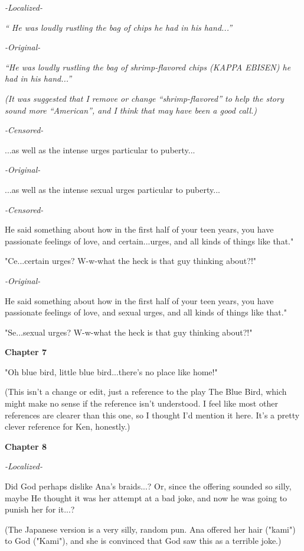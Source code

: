 \documentclass[
]{article}
\begin{document}
\emph{-Localized-}

\emph{`` He was loudly rustling the bag of chips he had in his
hand...''}

\emph{-Original-}

\emph{``He was loudly rustling the bag of shrimp-flavored chips (KAPPA
EBISEN) he had in his hand...''}

\emph{(It was suggested that I remove or change ``shrimp-flavored'' to
help the story sound more ``American'', and I think that may have been a
good call.)}

\emph{-Censored-}

...as well as the intense urges particular to puberty...

\emph{-Original-}

...as well as the intense sexual urges particular to puberty...

\emph{-Censored-}

He said something about how in the first half of your teen years, you
have passionate feelings of love, and certain...urges, and all kinds of
things like that."

"Ce...certain urges? W-w-what the heck is that guy thinking about?!"

\emph{-Original-}

He said something about how in the first half of your teen years, you
have passionate feelings of love, and sexual urges, and all kinds of
things like that."

"Se...sexual urges? W-w-what the heck is that guy thinking about?!"

\textbf{Chapter 7}

"Oh blue bird, little blue bird...there's no place like home!"

(This isn't a change or edit, just a reference to the play The Blue
Bird, which might make no sense if the reference isn't understood. I
feel like most other references are clearer than this one, so I thought
I'd mention it here. It's a pretty clever reference for Ken, honestly.)

\textbf{Chapter 8}

\emph{-Localized-}

Did God perhaps dislike Ana's braids...? Or, since the offering sounded
so silly, maybe He thought it was her attempt at a bad joke, and now he
was going to punish her for it...?

(The Japanese version is a very silly, random pun. Ana offered her hair
("kami") to God ("Kami"), and she is convinced that God saw this as a
terrible joke.)
\end{document}
